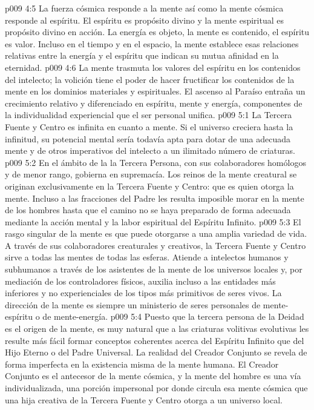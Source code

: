 \vs p009 4:5 \pc La fuerza cósmica responde a la mente así como la mente cósmica responde al espíritu. El espíritu es propósito divino y la mente espiritual es propósito divino en acción. La energía es objeto, la mente es contenido, el espíritu es valor. Incluso en el tiempo y en el espacio, la mente establece esas relaciones relativas entre la energía y el espíritu que indican su mutua afinidad en la eternidad.
\vs p009 4:6 La mente trasmuta los valores del espíritu en los contenidos del intelecto; la volición tiene el poder de hacer fructificar los contenidos de la mente en los dominios materiales y espirituales. El ascenso al Paraíso entraña un crecimiento relativo y diferenciado en espíritu, mente y energía, componentes de la individualidad experiencial que el ser personal unifica.
\vs p009 5:1 La Tercera Fuente y Centro es infinita en cuanto a mente. Si el universo creciera hasta la infinitud, su potencial mental sería todavía apta para dotar de una adecuada mente y de otros imperativos del intelecto a un ilimitado número de criaturas.
\vs p009 5:2 En el ámbito de la  la Tercera Persona, con sus colaboradores homólogos y de menor rango, gobierna en supremacía. Los reinos de la mente creatural se originan exclusivamente en la Tercera Fuente y Centro: que es quien otorga la mente. Incluso a las fracciones del Padre les resulta imposible morar en la mente de los hombres hasta que el camino no se haya preparado de forma adecuada mediante la acción mental y la labor espiritual del Espíritu Infinito.
\vs p009 5:3 El rasgo singular de la mente es que puede otorgarse a una amplia variedad de vida. A través de sus colaboradores creaturales y creativos, la Tercera Fuente y Centro sirve a todas las mentes de todas las esferas. Atiende a intelectos humanos y subhumanos a través de los asistentes de la mente de los universos locales y, por mediación de los controladores físicos, auxilia incluso a las entidades más inferiores y no experienciales de los tipos más primitivos de seres vivos. La dirección de la mente es siempre un ministerio de seres personales de mente\hyp{}espíritu o de mente\hyp{}energía.
\vs p009 5:4 \pc Puesto que la tercera persona de la Deidad es el origen de la mente, es muy natural que a las criaturas volitivas evolutivas les resulte más fácil formar conceptos coherentes acerca del Espíritu Infinito que del Hijo Eterno o del Padre Universal. La realidad del Creador Conjunto se revela de forma imperfecta en la existencia misma de la mente humana. El Creador Conjunto es el antecesor de la mente cósmica, y la mente del hombre es una vía individualizada, una porción impersonal por donde circula esa mente cósmica que una hija creativa de la Tercera Fuente y Centro otorga a un universo local.
